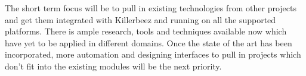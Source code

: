 The short term focus will be to pull in existing technologies from other
projects and get them integrated with Killerbeez and running on all the
supported platforms.  There is ample research, tools and techniques available
now which have yet to be applied in different domains. Once the state of the
art has been incorporated, more automation and designing interfaces to pull in
projects which don't fit into the existing modules will be the next priority.













